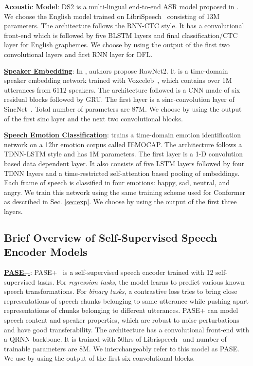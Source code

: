 \documentclass{article}
\begin{document}
\underline{\textbf{Acoustic Model}}: \ac{DS2} is a multi-lingual end-to-end \ac{ASR} model proposed in \cite{amodei2016deep}.
We choose the English model trained on LibriSpeech~\cite{panayotov2015librispeech}
consisting of 13M parameters.
The architecture follows the \ac{RNN}-\ac{CTC} style.
It has a convolutional front-end which is followed by five \ac{BLSTM} layers and final classification/CTC layer for English graphemes.
We choose  by using the output of the first two convolutional layers and first RNN layer for DFL.

\underline{\textbf{Speaker Embedding}}: In \cite{jung2020improved}, authors propose RawNet2.
It is a time-domain speaker embedding network trained with Voxceleb~\cite{jung2020improved}, which contains over 1M utterances from 6112 speakers.
The architecture
followed is a \ac{CNN} made of six residual blocks followed by \ac{GRU}.
The first layer is a sinc-convolution layer of SincNet~\cite{ravanelli2018speaker}.
Total number of parameters are 87M.
We choose  by using the output of the first sinc layer and the next two convolutional blocks.

\underline{\textbf{Speech Emotion Classification}}: \cite{sarma2018emotion} trains a time-domain emotion identification network on a 12hr emotion corpus called IEMOCAP.
The architecture follows a \ac{TDNN}-LSTM style and has 1M parameters.
The first layer is a 1-D convolution based data dependent layer.
It also consists of five LSTM layers followed by four \ac{TDNN} layers and a time-restricted self-attention based pooling of embeddings.
Each frame of speech is classified in four emotions: happy, sad, neutral, and angry.
We train this network
using the same training scheme used for Conformer as described in Sec. \ref{sec:exp}.
We choose  by using the output of the first three layers.


\subsection{Brief Overview of Self-Supervised Speech Encoder Models}
\underline{\textbf{PASE+}}: PASE+~\cite{ravanelli2020multi} is a self-supervised speech encoder trained with 12 self-supervised tasks.
For \emph{regression tasks}, the model learns to predict various known speech transformations.
For \emph{binary tasks}, a contrastive loss tries to bring close representations of speech chunks belonging to same utterance while pushing apart representations of chunks belonging to different utterances.
PASE+ can model speech content and speaker properties, which are robust to noise perturbations and have good transferability.
The architecture has a convolutional front-end with a \ac{QRNN} backbone.
It is trained with 50hrs of Librispeech~\cite{panayotov2015librispeech} and number of trainable parameters are 8M.
We interchangeably refer to this model as PASE.
We use  by using the output of the first six convolutional blocks.
\end{document}
